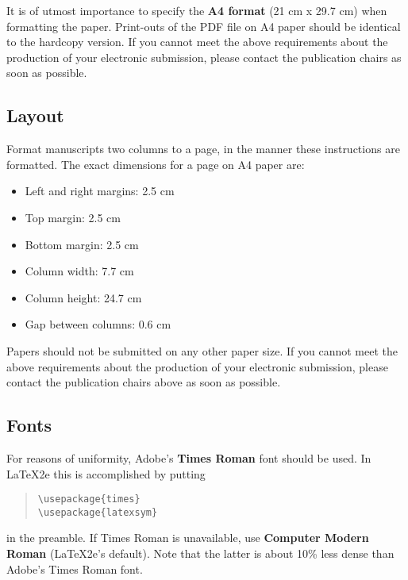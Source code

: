 \documentclass[11pt]{article}
\begin{document}
It is of utmost importance to specify the \textbf{A4 format} (21 cm
x 29.7 cm) when formatting the paper. Print-outs of the PDF file on A4 
paper should be identical to the hardcopy version. If you cannot 
meet the above requirements about the production of your 
electronic submission, please contact the publication chairs 
as soon as possible.


\subsection{Layout}
\label{ssec:layout}

Format manuscripts two columns to a page, in the manner these
instructions are formatted. The exact dimensions for a page on A4
paper are:

\begin{itemize}
\item Left and right margins: 2.5 cm
\item Top margin: 2.5 cm
\item Bottom margin: 2.5 cm
\item Column width: 7.7 cm
\item Column height: 24.7 cm
\item Gap between columns: 0.6 cm
\end{itemize}

\noindent Papers should not be submitted on any other paper size.
 If you cannot meet the above requirements about the production of your electronic submission, please contact the publication chairs above as soon as possible.


\subsection{Fonts}

For reasons of uniformity, Adobe's {\bf Times Roman} font should be
used. In \LaTeX2e{} this is accomplished by putting

\begin{quote}
\begin{verbatim}
\usepackage{times}
\usepackage{latexsym}
\end{verbatim}
\end{quote}
in the preamble. If Times Roman is unavailable, use {\bf Computer
  Modern Roman} (\LaTeX2e{}'s default).  Note that the latter is about
  10\% less dense than Adobe's Times Roman font.
\end{document}

